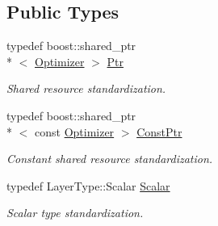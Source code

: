 \subsection*{Public Types}
\begin{DoxyCompactItemize}
\item 
typedef boost\-::shared\-\_\-ptr\\*
$<$ \hyperlink{classffnn_1_1optimizer_1_1_optimizer}{Optimizer} $>$ \hyperlink{classffnn_1_1optimizer_1_1_optimizer_ac03e7181934bf0c12a97fc67a60484ab}{Ptr}
\begin{DoxyCompactList}\small\item\em Shared resource standardization. \end{DoxyCompactList}\item 
typedef boost\-::shared\-\_\-ptr\\*
$<$ const \hyperlink{classffnn_1_1optimizer_1_1_optimizer}{Optimizer} $>$ \hyperlink{classffnn_1_1optimizer_1_1_optimizer_a5d62c55f6f830e993ffe801fb17a1c3a}{Const\-Ptr}
\begin{DoxyCompactList}\small\item\em Constant shared resource standardization. \end{DoxyCompactList}\item 
typedef Layer\-Type\-::\-Scalar \hyperlink{classffnn_1_1optimizer_1_1_optimizer_acaa42e2661559c561caf881c4d934b8c}{Scalar}
\begin{DoxyCompactList}\small\item\em Scalar type standardization. \end{DoxyCompactList}\end{DoxyCompactItemize}
